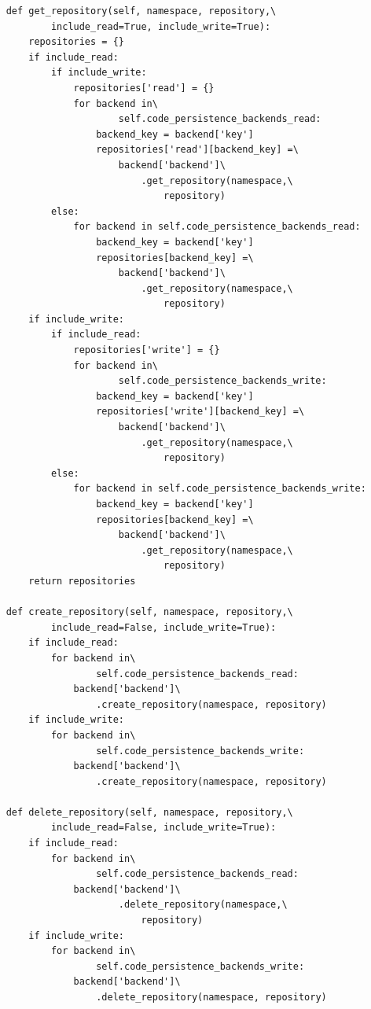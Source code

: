 \begin{lstlisting}
    def get_repository(self, namespace, repository,\
            include_read=True, include_write=True):
        repositories = {}
        if include_read:
            if include_write:
                repositories['read'] = {}
                for backend in\
                        self.code_persistence_backends_read:
                    backend_key = backend['key']
                    repositories['read'][backend_key] =\
                        backend['backend']\
                            .get_repository(namespace,\
                                repository)
            else:
                for backend in self.code_persistence_backends_read:
                    backend_key = backend['key']
                    repositories[backend_key] =\
                        backend['backend']\
                            .get_repository(namespace,\
                                repository)
        if include_write:
            if include_read:
                repositories['write'] = {}
                for backend in\
                        self.code_persistence_backends_write:
                    backend_key = backend['key']
                    repositories['write'][backend_key] =\
                        backend['backend']\
                            .get_repository(namespace,\
                                repository)
            else:
                for backend in self.code_persistence_backends_write:
                    backend_key = backend['key']
                    repositories[backend_key] =\
                        backend['backend']\
                            .get_repository(namespace,\
                                repository)
        return repositories

    def create_repository(self, namespace, repository,\
            include_read=False, include_write=True):
        if include_read:
            for backend in\
                    self.code_persistence_backends_read:
                backend['backend']\
                    .create_repository(namespace, repository)
        if include_write:
            for backend in\
                    self.code_persistence_backends_write:
                backend['backend']\
                    .create_repository(namespace, repository)

    def delete_repository(self, namespace, repository,\
            include_read=False, include_write=True):
        if include_read:
            for backend in\
                    self.code_persistence_backends_read:
                backend['backend']\
                        .delete_repository(namespace,\
                            repository)
        if include_write:
            for backend in\
                    self.code_persistence_backends_write:
                backend['backend']\
                    .delete_repository(namespace, repository)


\end{lstlisting}
